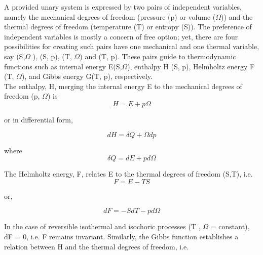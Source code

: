 \documentclass[12pt]{article}
\newcommand*{\1}{\hspace{1pt}}
\begin{document}
        A provided unary system is expressed by two pairs of independent variables, namely 
    the mechanical degrees of freedom (pressure (p) or volume ($\Omega$)) and the thermal 
    degrees of freedom (temperature (T) or entropy (S)). The preference of independent 
    variables is mostly a concern of free option; yet, there are four possibilities for 
    creating such pairs have one mechanical and one thermal variable, say (S,$\Omega$ ), 
    (S, p), (T, $\Omega$) and (T, p). These pairs guide to thermodynamic functions such as 
    internal energy E(S,$\Omega$), enthalpy H (S, p), Helmholtz energy F (T, $\Omega$), and 
    Gibbs energy G(T, p), respectively.\\

    The enthalpy, H, merging the internal energy E to the mechanical degrees of freedom
    (p, $\Omega$) is\\
                    
                 \begin{equation}
                    H = E + p\Omega
                \end{equation}

    or in differential form,
                
                \begin{equation}
                    dH = \delta Q + \Omega dp
                \end{equation}

    where       \begin{equation*}
                    \delta Q = dE + pd \Omega
                \end{equation*}

    The Helmholtz energy, F, relates E to the thermal degrees of freedom (S,T), i.e.\\

                \begin{equation}
                    F = E - TS
                \end{equation}

    or,

                \begin{equation}
                    dF = -SdT - pd \Omega
                \end{equation}

    In the case of reversible isothermal and isochoric processes (T , $\Omega$ = constant),
    dF = 0, i.e.
    F remains invariant.
        Similarly, the Gibbs function establishes a relation between H and the thermal degrees
    of freedom, i.e.\\
\end{document}
